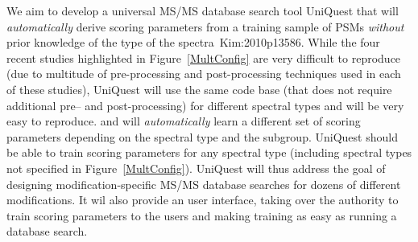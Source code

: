 We aim to develop a universal MS/MS database search tool UniQuest that will {\em automatically} derive scoring parameters 
from a training sample of PSMs {\em without} prior
knowledge of the type of the spectra~\cite{unv}{Kim:2010p13586}.
While the four recent studies highlighted in Figure~\ref{MultConfig}
are very difficult to reproduce (due to multitude of pre-processing and post-processing techniques used in each of these studies), UniQuest 
will use the same code base (that does not require  additional pre-- and post-processing) 
for different spectral types and will be very easy to reproduce. 
and will {\em automatically} learn a different set of scoring parameters depending on the spectral type and the subgroup.
%
UniQuest should be able to train scoring parameters for any spectral type (including spectral types not specified in Figure~\ref{MultConfig}).
UniQuest will thus address the goal of designing modification-specific MS/MS database searches for dozens of different modifications. 
It wil also provide an user interface,
taking over the authority to train scoring parameters to the users
and making training as easy as running a database search.


